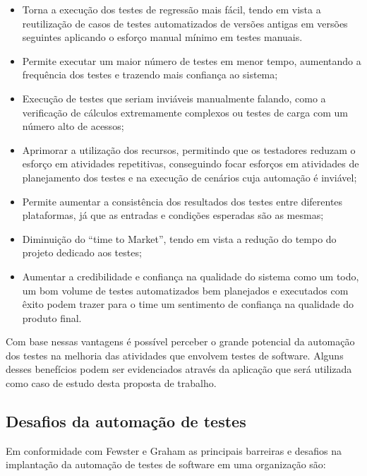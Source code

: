 \begin{itemize}
	\item Torna a execução dos testes de regressão mais fácil, tendo em vista a reutilização de casos de testes automatizados de versões antigas em versões seguintes aplicando o esforço manual mínimo em testes manuais.
	\item Permite executar um maior número de testes em menor tempo, aumentando a frequência dos testes e trazendo mais confiança ao sistema;
	\item Execução de testes que seriam inviáveis manualmente falando, como a verificação de cálculos extremamente complexos ou testes de carga com um número alto de acessos;
	\item Aprimorar a utilização dos recursos, permitindo que os testadores reduzam o esforço em atividades repetitivas, conseguindo focar esforços em atividades de planejamento dos testes e na execução de cenários cuja automação é inviável;
	\item Permite aumentar a consistência dos resultados dos testes entre diferentes plataformas, já que as entradas e condições esperadas são as mesmas;
	\item Diminuição do “time to Market”, tendo em vista a redução do tempo do projeto dedicado aos testes;
	\item Aumentar a credibilidade e confiança na qualidade do sistema como um todo, um bom volume de testes automatizados bem planejados e executados com êxito podem trazer para o time um sentimento de confiança na qualidade do produto final.
\end{itemize}

Com base nessas vantagens é possível perceber o grande potencial da automação dos testes na melhoria das atividades que envolvem testes de software. Alguns desses benefícios podem ser evidenciados através da aplicação que será utilizada como caso de estudo desta proposta de trabalho.

\subsection{Desafios da automação de testes}

Em conformidade com Fewster e Graham \cite{Fewster1999} as principais barreiras e desafios na implantação da automação de testes de software em uma organização são:

